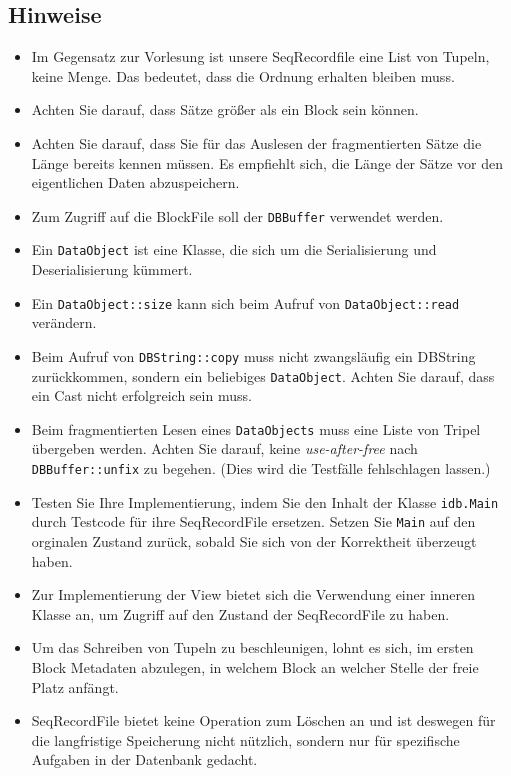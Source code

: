 \subsection{Hinweise}
\begin{itemize}
	\item Im Gegensatz zur Vorlesung ist unsere SeqRecordfile eine List von Tupeln, keine Menge. Das bedeutet, dass die Ordnung erhalten bleiben muss.
	\item Achten Sie darauf, dass Sätze größer als ein Block sein können.
	\item Achten Sie darauf, dass Sie für das Auslesen der fragmentierten Sätze die Länge bereits kennen müssen.
		Es empfiehlt sich, die Länge der Sätze vor den eigentlichen Daten abzuspeichern.
	\item Zum Zugriff auf die BlockFile soll der \texttt{DBBuffer} verwendet werden.
	\item Ein \texttt{DataObject} ist eine Klasse, die sich um die Serialisierung und Deserialisierung kümmert.
	\item Ein \texttt{DataObject::size} kann sich beim Aufruf von \texttt{DataObject::read} verändern.
	\item Beim Aufruf von \texttt{DBString::copy} muss nicht zwangsläufig ein DBString zurückkommen, sondern ein beliebiges \texttt{DataObject}.
			Achten Sie darauf, dass ein Cast nicht erfolgreich sein muss.
	\item Beim fragmentierten Lesen eines \texttt{DataObjects} muss eine Liste von Tripel übergeben werden.
		Achten Sie darauf, keine \textit{use-after-free} nach \texttt{DBBuffer::unfix} zu begehen. (Dies wird die Testfälle fehlschlagen lassen.)
	\item Testen Sie Ihre Implementierung, indem Sie den Inhalt der Klasse \texttt{idb.Main} durch Testcode für ihre SeqRecordFile ersetzen.
		Setzen Sie \texttt{Main} auf den orginalen Zustand zurück, sobald Sie sich von der Korrektheit überzeugt haben.
	\item Zur Implementierung der View bietet sich die Verwendung einer inneren Klasse an, um Zugriff auf den Zustand der SeqRecordFile zu haben.
	\item Um das Schreiben von Tupeln zu beschleunigen, lohnt es sich, im ersten Block Metadaten abzulegen, in welchem Block an welcher Stelle der freie Platz anfängt.
	\item SeqRecordFile bietet keine Operation zum Löschen an und ist deswegen für die langfristige Speicherung nicht nützlich, sondern nur für spezifische Aufgaben in der Datenbank gedacht.
\end{itemize}
